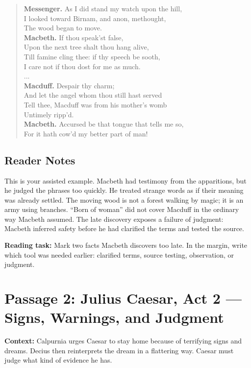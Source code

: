 \documentclass[12pt]{article}
\newenvironment{playpassage}{\begin{quote}\footnotesize\setlength{\parskip}{0.08em}\setlength{\parindent}{0pt}}{\end{quote}}
\newcommand{\speaker}[1]{\textbf{#1.}}
\begin{document}
\begin{playpassage}
\speaker{Messenger} As I did stand my watch upon the hill,\\
I looked toward Birnam, and anon, methought,\\
The wood began to move.\\
\speaker{Macbeth} If thou speak'st false,\\
Upon the next tree shalt thou hang alive,\\
Till famine cling thee: if thy speech be sooth,\\
I care not if thou dost for me as much.\\
...\\
\speaker{Macduff} Despair thy charm;\\
And let the angel whom thou still hast served\\
Tell thee, Macduff was from his mother's womb\\
Untimely ripp'd.\\
\speaker{Macbeth} Accursed be that tongue that tells me so,\\
For it hath cow'd my better part of man!
\end{playpassage}

\subsection*{Reader Notes}

This is your assisted example. Macbeth had testimony from the apparitions, but he judged the phrases too quickly. He treated strange words as if their meaning was already settled. The moving wood is not a forest walking by magic; it is an army using branches. ``Born of woman'' did not cover Macduff in the ordinary way Macbeth assumed. The late discovery exposes a failure of judgment: Macbeth inferred safety before he had clarified the terms and tested the source.

\textbf{Reading task:} Mark two facts Macbeth discovers too late. In the margin, write which tool was needed earlier: clarified terms, source testing, observation, or judgment.

\newpage

\section*{Passage 2: Julius Caesar, Act 2 --- Signs, Warnings, and Judgment}

\textbf{Context:} Calpurnia urges Caesar to stay home because of terrifying signs and dreams. Decius then reinterprets the dream in a flattering way. Caesar must judge what kind of evidence he has.
\end{document}

